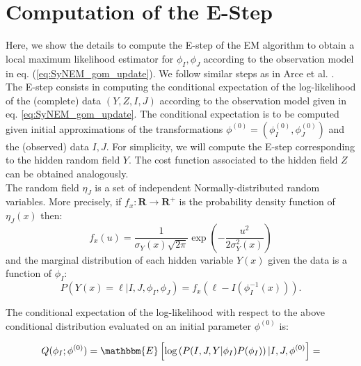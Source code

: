 \appendix
\section{Computation of the E-Step}\label{ap:E_step}
Here, we show the details to compute the E-step of the EM algorithm \cite{Dempster1977} to obtain a local maximum likelihood estimator for $\phi_{I}, \phi_{J}$
according to the observation model in eq. (\ref{eq:SyNEM_gom_update}). We follow similar steps as in Arce et al. \cite{Arce-santana2014}.\\

The E-step \cite{Dempster1977} consists in computing the conditional expectation of the log-likelihood of the (complete) data $(Y, Z, I, J)$ according to the observation model given
in eq. \ref{eq:SyNEM_gom_update}. The conditional expectation is to be computed given initial approximations of the transformations
$\phi^{(0)} = \left(\phi_{I}^{(0)}, \phi_{J}^{(0)}\right)$ and the (observed) data $I, J$. For simplicity, we will compute the E-step corresponding to the hidden random field $Y$.
The cost function associated to the hidden field $Z$ can be obtained analogously.\\

The random field $\eta_{J}$ is a set of independent Normally-distributed random variables. More precisely, if $f_{x}:\mathbf{R}\rightarrow \mathbf{R}^{+}$ is the probability density
function of $\eta_{J}(x)$ then:
\begin{equation}\label{eq:gaussian}
    f_{x}(u) = \frac{1}{\sigma_{Y}(x)\sqrt{2 \pi}}\exp\left(-\frac{u^{2}}{2\sigma^{2}_{Y}(x)}\right)
\end{equation}
and the marginal distribution of each hidden variable $Y(x)$ given the data is a function of $\phi_I$:
\begin{equation}
    P(Y(x) = \ell | I, J, \phi_{I}, \phi_{J}) = f_{x}(\ell - I(\phi^{-1}_{I}(x))).
\end{equation}

The conditional expectation of the log-likelihood with respect to the above conditional distribution evaluated on an initial parameter $\phi^{(0)}$ is:

\begin{equation}
    Q(\phi_{I}; \phi^{(0)}) = \mathbbm{E}\left[ \log \left(P(I, J, Y|\phi_{I})P(\phi_{I})\right) | I, J, \phi^{(0)}\right] =
\end{equation}

